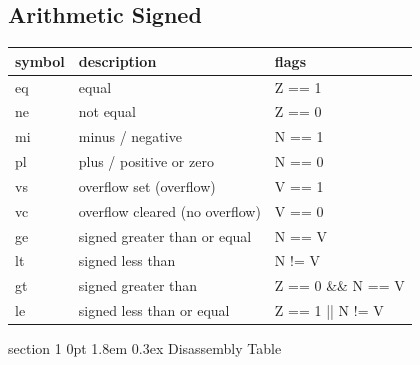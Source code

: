 \documentclass
[
    10pt,
    a4paper,
]
{article}
\makeatletter
\renewcommand\section{\@startsection
  {section}     %
  {1}           %
  {0pt}         %
  {1.8em}       %
  {0.3ex}       %
  {\normalfont\Large\bfseries}}
\makeatother
\begin{document}
\subsection{Arithmetic Signed}
{\normalsize
\begin{tabular}
{ | p{} | p{} | p{} | }
    \hline
    \textbf{symbol} & \textbf{description} & \textbf{flags}\\
    \hline
    \hline
    eq      & equal                             & Z == 1\\
    \hline
    ne      & not equal                         & Z == 0\\
    \hline
    mi      & minus / negative                  & N == 1\\
    \hline
    pl      & plus / positive or zero           & N == 0\\
    \hline
    vs      & overflow set (overflow)           & V == 1\\
    \hline
    vc      & overflow cleared (no overflow)    & V == 0\\
    \hline
    ge      & signed greater than or equal      & N == V\\
    \hline
    lt      & signed less than                  & N != V\\
    \hline
    gt      & signed greater than               & Z == 0 \&\& N == V\\
    \hline
    le      & signed less than or equal         & Z == 1 ||   N != V\\
    \hline
\end{tabular}
}
\pagebreak


\section{Disassembly Table}
\end{document}

